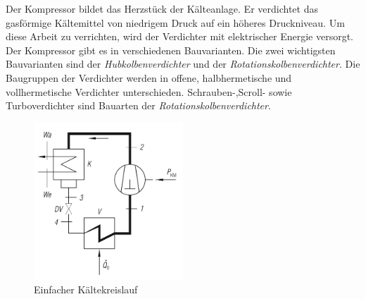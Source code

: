 Der Kompressor bildet das Herzstück der Kälteanlage. Er verdichtet das gasförmige Kältemittel von niedrigem Druck auf ein höheres Druckniveau. Um diese Arbeit zu verrichten, wird der Verdichter mit elektrischer Energie versorgt. Der Kompressor gibt es in verschiedenen Bauvarianten. Die zwei wichtigsten Bauvarianten sind der \textit{Hubkolbenverdichter} und der \textit{Rotationskolbenverdichter}. Die Baugruppen der Verdichter werden in offene, halbhermetische und vollhermetische Verdichter unterschieden.  Schrauben-,Scroll- sowie Turboverdichter sind Bauarten der \textit{Rotationskolbenverdichter}. 

\begin{figure}[htb]
\centering		\includegraphics[width=0.50\textwidth]{Pictures/Kaltekreislauf_beahr.png}
\caption{Einfacher Kältekreislauf}
\label{fig:einfacher Kältekreislauf}
\end{figure}


